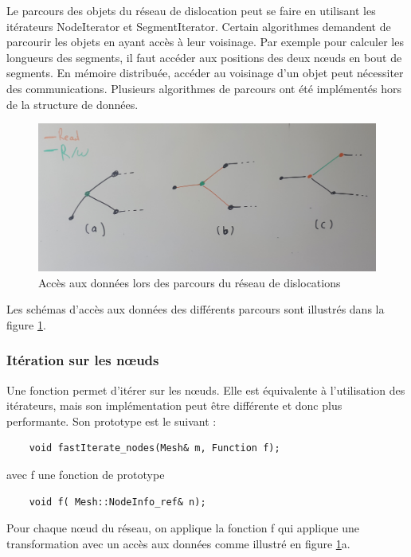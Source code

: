 Le parcours des objets du réseau de dislocation peut se faire en utilisant les itérateurs NodeIterator et SegmentIterator. Certain algorithmes demandent de parcourir les objets en ayant accès à leur voisinage. Par exemple pour calculer les longueurs des segments, il faut accéder aux positions des deux nœuds en bout de segments. En mémoire distribuée, accéder au voisinage d'un objet peut nécessiter des communications. Plusieurs algorithmes de parcours ont été implémentés hors de la structure de données.

\begin{figure}
	\includegraphics[width=\textwidth]{img/parcours_mesh}
	\caption{Accès aux données lors des parcours du réseau de dislocations}
	\label{fig:parcours_mesh}
\end{figure}

Les schémas d'accès aux données des différents parcours sont illustrés dans la figure \ref{fig:parcours_mesh}.


\subsubsection{Itération sur les nœuds}

Une fonction permet d'itérer sur les nœuds. Elle est équivalente à l'utilisation des itérateurs, mais son implémentation peut être différente et donc plus performante. Son prototype est le suivant : 

\begin{verbatim}
	void fastIterate_nodes(Mesh& m, Function f);
\end{verbatim}

avec f une fonction de prototype

\begin{verbatim}
	void f( Mesh::NodeInfo_ref& n);
\end{verbatim}

Pour chaque nœud du réseau, on applique la fonction f qui applique une transformation avec un accès aux données comme illustré en figure \ref{fig:parcours_mesh}a.

